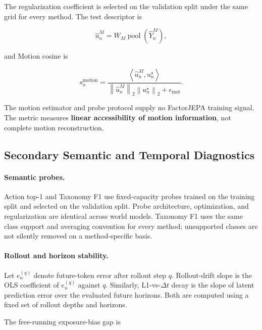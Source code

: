 The regularization coefficient is selected on the validation split
under the same grid for every method. The test descriptor is

\begin{equation*}
\widehat u_n^M
=
W_M
\operatorname{pool}
\left(
\widehat Y_n^M
\right),
\end{equation*}

and Motion cosine is

\begin{equation*}
s_n^{\mathrm{motion}}
=
\frac{
\left\langle
\widehat u_n^M,u_n^\star
\right\rangle
}{
\left\|\widehat u_n^M\right\|_2
\left\|u_n^\star\right\|_2
+
\epsilon_{\mathrm{mot}}
}.
\end{equation*}

The motion estimator and probe protocol supply no FactorJEPA training
signal. The metric measures \textbf{linear accessibility of motion
information}, not complete motion reconstruction.


\subsection{Secondary Semantic and Temporal Diagnostics}
\label{app:secondary_metric_definitions}

\paragraph{Semantic probes.}
Action top-1 and Taxonomy F1 use fixed-capacity probes trained on the
training split and selected on the validation split. Probe architecture,
optimization, and regularization are identical across world models.
Taxonomy F1 uses the same class support and averaging convention for
every method; unsupported classes are not silently removed on a
method-specific basis.

\paragraph{Rollout and horizon stability.}
Let \(e_n^{(q)}\) denote future-token error after rollout step \(q\).
Rollout-drift slope is the OLS coefficient of \(e_n^{(q)}\) against
\(q\). Similarly, L1-vs-\(\Delta t\) decay is the slope of latent
prediction error over the evaluated future horizons. Both are computed
using a fixed set of rollout depths and horizons.

The free-running exposure-bias gap is

